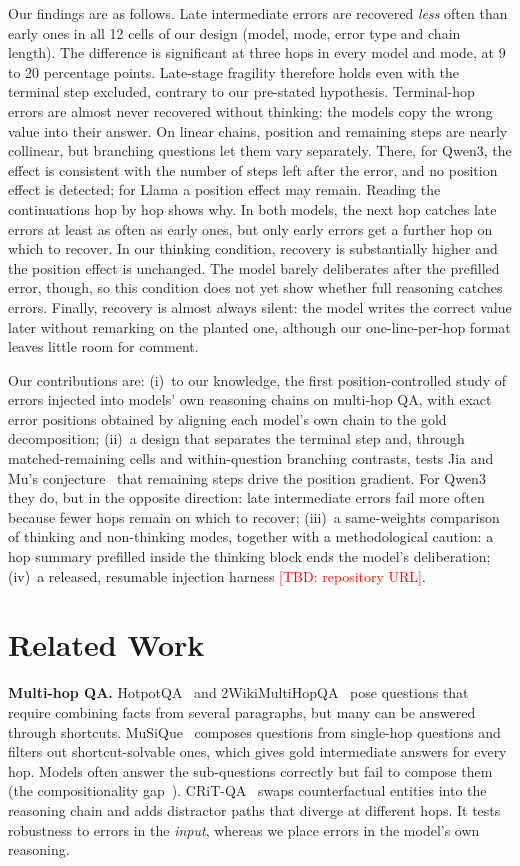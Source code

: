 \documentclass[conference]{IEEEtran}
\newcommand{\tbd}[1]{\textcolor{red}{[TBD: #1]}}
\begin{document}
Our findings are as follows. Late intermediate errors are recovered \emph{less} often than early ones in all 12 cells of our design (model, mode, error type and chain length). The difference is significant at three hops in every model and mode, at 9 to 20 percentage points. Late-stage fragility therefore holds even with the terminal step excluded, contrary to our pre-stated hypothesis. Terminal-hop errors are almost never recovered without thinking: the models copy the wrong value into their answer. On linear chains, position and remaining steps are nearly collinear, but branching questions let them vary separately. There, for Qwen3, the effect is consistent with the number of steps left after the error, and no position effect is detected; for Llama a position effect may remain. Reading the continuations hop by hop shows why. In both models, the next hop catches late errors at least as often as early ones, but only early errors get a further hop on which to recover. In our thinking condition, recovery is substantially higher and the position effect is unchanged. The model barely deliberates after the prefilled error, though, so this condition does not yet show whether full reasoning catches errors. Finally, recovery is almost always silent: the model writes the correct value later without remarking on the planted one, although our one-line-per-hop format leaves little room for comment.

Our contributions are:
(i)~to our knowledge, the first position-controlled study of errors injected into models' own reasoning chains on multi-hop QA, with exact error positions obtained by aligning each model's own chain to the gold decomposition;
(ii)~a design that separates the terminal step and, through matched-remaining cells and within-question branching contrasts, tests Jia and Mu's conjecture~\cite{jiamu} that remaining steps drive the position gradient. For Qwen3 they do, but in the opposite direction: late intermediate errors fail more often because fewer hops remain on which to recover;
(iii)~a same-weights comparison of thinking and non-thinking modes, together with a methodological caution: a hop summary prefilled inside the thinking block ends the model's deliberation;
(iv)~a released, resumable injection harness \tbd{repository URL}.

\section{Related Work}
\textbf{Multi-hop QA.} HotpotQA~\cite{hotpotqa} and 2WikiMultiHopQA~\cite{twowiki} pose questions that require combining facts from several paragraphs, but many can be answered through shortcuts. MuSiQue~\cite{musique} composes questions from single-hop questions and filters out shortcut-solvable ones, which gives gold intermediate answers for every hop. Models often answer the sub-questions correctly but fail to compose them (the compositionality gap~\cite{press}). CRiT-QA~\cite{critqa} swaps counterfactual entities into the reasoning chain and adds distractor paths that diverge at different hops. It tests robustness to errors in the \emph{input}, whereas we place errors in the model's own reasoning.
\end{document}
